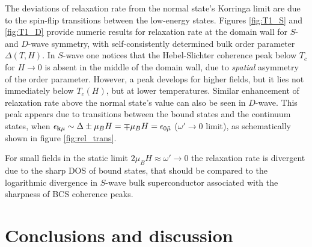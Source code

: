\documentclass[prb,aps,showpacs,amsmath,twocolumn,10pt]{revtex4-1}
\begin{document}
The deviations of relaxation rate from the normal state's Korringa limit\cite{Korringa1950601} 
are due to the spin-flip transitions between the low-energy states. 
Figures \ref{fig:T1_S} and \ref{fig:T1_D}
provide numeric results for relaxation rate at the domain wall for $S$- and $D$-wave symmetry, 
with self-consistently determined bulk order parameter $\Delta(T,H)$. 
In $S$-wave one notices that the Hebel-Slichter coherence peak below $T_c$ 
for $H\to0$ is absent in the middle of the domain wall, 
due to \emph{spatial} asymmetry of the order parameter. 
However, a peak develops for higher fields, but it lies not immediately below $T_c(H)$, but at lower temperatures. 
Similar enhancement of relaxation rate above the normal state's value can also be seen in $D$-wave. 
This peak appears due to transitions between the bound states and the continuum states, when 
$\epsilon_{{\bf k}\mu} \sim \Delta \pm \mu_B H = \mp \mu_B H = \epsilon_{0\bar{\mu}}$ 
($\omega' \to 0$ limit), as schematically shown in figure \ref{fig:rel_trans}. 

For small fields in the static limit $2\mu_B H \approx \omega' \to 0$ the 
relaxation rate is divergent due to the sharp DOS of bound states, 
that should be compared to the 
logarithmic divergence in $S$-wave bulk superconductor associated with 
the sharpness of BCS coherence peaks.\cite{tinkham}


\section{Conclusions and discussion}
\label{sec:concl}
%
\end{document}
